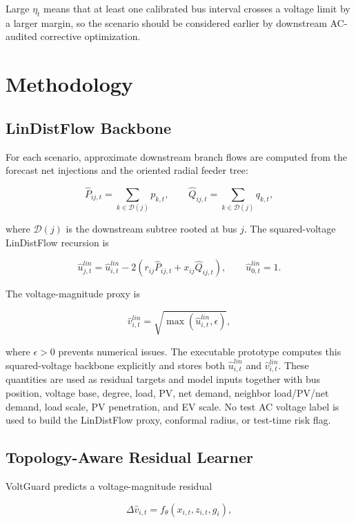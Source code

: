 \documentclass[
  preprint,12pt]{elsarticle}
\begin{document}
Large \(\eta_t\) means that at least one calibrated bus interval crosses
a voltage limit by a larger margin, so the scenario should be considered
earlier by downstream AC-audited corrective optimization.

\section{Methodology}\label{methodology}

\subsection{LinDistFlow Backbone}\label{lindistflow-backbone}

For each scenario, approximate downstream branch flows are computed from
the forecast net injections and the oriented radial feeder tree:

\[
\hat P_{ij,t} = \sum_{k\in\mathcal{D}(j)} p_{k,t}, \qquad
\hat Q_{ij,t} = \sum_{k\in\mathcal{D}(j)} q_{k,t},
\]

where \(\mathcal{D}(j)\) is the downstream subtree rooted at bus \(j\).
The squared-voltage LinDistFlow recursion is

\[
\hat u^{lin}_{j,t} =
\hat u^{lin}_{i,t} - 2(r_{ij}\hat P_{ij,t}+x_{ij}\hat Q_{ij,t}),
\qquad \hat u^{lin}_{0,t}=1.
\]

The voltage-magnitude proxy is

\[
\hat v^{lin}_{i,t}=\sqrt{\max(\hat u^{lin}_{i,t},\epsilon)},
\]

where \(\epsilon>0\) prevents numerical issues. The executable prototype
computes this squared-voltage backbone explicitly and stores both
\(\hat u^{lin}_{i,t}\) and \(\hat v^{lin}_{i,t}\). These quantities are
used as residual targets and model inputs together with bus position,
voltage base, degree, load, PV, net demand, neighbor load/PV/net demand,
load scale, PV penetration, and EV scale. No test AC voltage label is
used to build the LinDistFlow proxy, conformal radius, or test-time risk
flag.

\subsection{Topology-Aware Residual
Learner}\label{topology-aware-residual-learner}

VoltGuard predicts a voltage-magnitude residual

\[
\Delta \hat v_{i,t}=f_\theta(x_{i,t},z_{i,t},g_i),
\]
\end{document}
